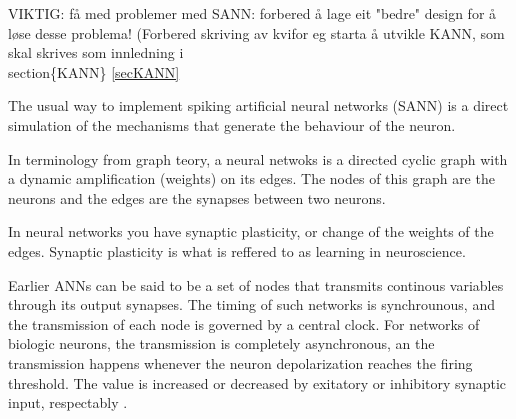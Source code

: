 	VIKTIG: få med problemer med SANN: forbered å lage eit "bedre" design for å løse desse problema! (Forbered skriving av kvifor eg starta å utvikle KANN, som skal skrives som innledning i \\section\{KANN\} \ref{secKANN}


	The usual way to implement spiking artificial neural networks (SANN) is a direct simulation of the mechanisms that generate the behaviour of the neuron.
	
	In terminology from graph teory, a neural netwoks is a directed cyclic graph with a dynamic amplification (weights) on its edges.
	The nodes of this graph are the neurons and the edges are the synapses between two neurons.%

	In neural networks you have synaptic plasticity, or change of the weights of the edges. Synaptic plasticity is what is reffered to as learning in neuroscience. %


	Earlier ANNs can be said to be a set of nodes that transmits continous variables through its output synapses. The timing of such networks is synchrounous, and the transmission of each node is governed by a central clock.
	For networks of biologic neurons, the transmission is completely asynchronous, an the transmission happens whenever the neuron depolarization reaches the firing threshold.
	The value is increased or decreased by exitatory or inhibitory synaptic input, respectably .
	
